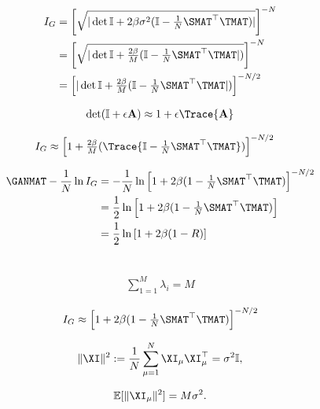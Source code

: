 \begin{align}
  \label{eqn:I_7}
  I_G &=
  \left[\sqrt{|\det \mathbb{I} + 2\beta\sigma^{2}(\mathbb{I}-\tfrac{1}{N}\SMAT^{\top}\TMAT)|}\right]^{-N}  \\ \nonumber
 &=
  \left[\sqrt{|\det \mathbb{I}  + \tfrac{2\beta}{M}(\mathbb{I}-\tfrac{1}{N}\SMAT^{\top}\TMAT|)}\right]^{-N} \\ \nonumber
  &=
  \left[|\det \mathbb{I}  + \tfrac{2\beta}{M}(\mathbb{I}-\tfrac{1}{N}\SMAT^{\top}\TMAT|)\right]^{-N/2} 
\end{align}

\begin{align}
\det(\mathbb{I}+\epsilon\mathbf{A})\approx1+\epsilon\Trace{\mathbf{A}}
\end{align}

\begin{align}
  \label{eqn:I_8}
  I_G &\approx  \left[1  + \tfrac{2\beta}{M}(\Trace{\mathbb{I}-\tfrac{1}{N}\SMAT^{\top}\TMAT})\right]^{-N/2} 
\end{align}

\begin{align}
    \label{eqn:GANmat}
\GANMAT  -\frac{1}{N}\ln I_G
  &=  -\frac{1}{N}\ln  \left[1  + 2\beta(1-\tfrac{1}{N}\SMAT^{\top}\TMAT)\right]^{-N/2} \\ \nonumber
  &= \frac{1}{2}\ln  \left[1  + 2\beta(1-\tfrac{1}{N}\SMAT^{\top}\TMAT)\right] \\ \nonumber
 &=  \frac{1}{2}\ln \left[1 + 2\beta(1-R)\right] \\ \nonumber
\end{align}

\begin{align}
  \label{eqn:W_normalization}
  \sum_{1=1}^{M}\lambda_{i}=M
\end{align}

\begin{align}
  \label{eqn:I_9}
    I_G\approx  \left[1  + 2\beta(1-\tfrac{1}{N}\SMAT^{\top}\TMAT)\right]^{-N/2} 
\end{align}

\begin{equation}
  \Vert \XI \Vert^2 :=\frac{1}{N} \sum_{\mu=1}^{N} \XI_\mu \XI_\mu^{\top} = \sigma^{2}\mathbb{I} ,
\end{equation}

\begin{equation}
\mathbb{E}[\Vert \XI_{\mu} \Vert^2] = M \sigma^2 .
\end{equation}


